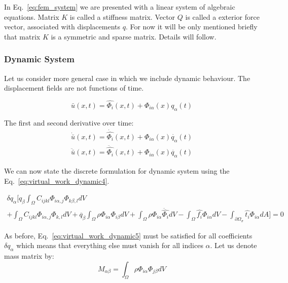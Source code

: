 \documentclass[en]{minipw} %
\begin{document}
In Eq.~\ref{eq:fem_system} we are presented with a linear system of algebraic equations. Matrix $K$ is called a stiffness matrix. Vector $Q$ is called a exterior force vector, associated with displacements $q$. For now it will be only mentioned briefly that matrix $K$ is a symmetric and sparse matrix. Details will follow.

\subsubsection{Dynamic System}
Let us consider more general case in which we include dynamic behaviour. The displacement fields are not functions of time.

\begin{equation}
\bar{u}(x, t) = \hat{\Phi_i}(x, t) + \Phi_{i \alpha}(x)q_{\alpha}(t)
\end{equation}

The first and second derivative over time:
\begin{equation}
\begin{aligned}
\dot{\bar{u}}(x, t) = \dot{\hat{\Phi_i}}(x, t) + \Phi_{i \alpha}(x)\dot{q_{\alpha}}(t)
\\
\ddot{\bar{u}}(x, t) = \ddot{\hat{\Phi_i}}(x, t) + \Phi_{i \alpha}(x)\ddot{q_{\alpha}}(t)
\end{aligned}
\end{equation}

We can now state the discrete formulation for dynamic system using the Eq.~\ref{eq:virtual_work_dynamic4}.

\begin{equation}
\label{eq:virtual_work_dynamic5}
\begin{aligned}
\delta q_{\alpha}[ q_{\beta} \int_{\Omega} C_{ijkl} \Phi_{i \alpha,j} \Phi_{k \beta,l} dV 
\\
+ \int_{\Omega} C_{ijkl} \Phi_{i \alpha,j} \hat{\Phi}_{k,l} dV + \ddot{q_{\beta}} \int_{\Omega}\rho \Phi_{i \alpha} \Phi_{i \beta} dV + \int_{\Omega} \rho \Phi_{i \alpha} \ddot{\hat{\Phi_{i}}} dV - \int_{\Omega} \hat{f_i} \Phi_{i \alpha} dV - \int_{\partial \Omega_{\sigma}} \hat{t_i}\Phi_{i \alpha} dA] = 0
\end{aligned}
\end{equation}

As before, Eq.~\ref{eq:virtual_work_dynamic5} must be satisfied for all coefficients $\delta q_{\alpha}$ which means that everything else must vanish for all indices $\alpha$. Let us denote mass matrix by:
\begin{equation}
\label{eq:mass_matrix1}
M_{\alpha \beta} = \int_{\Omega} \rho \Phi_{i \alpha} \Phi_{j \beta} dV 
\end{equation}
\end{document}
